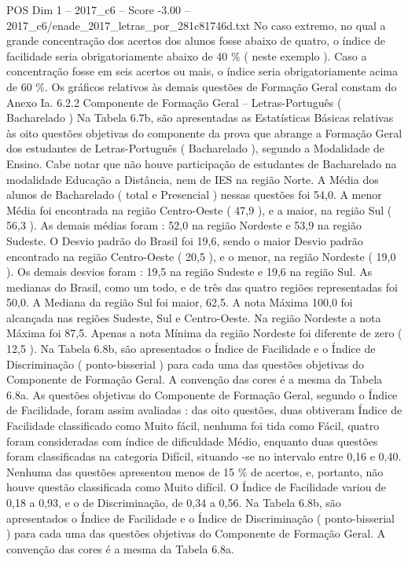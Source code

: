 \begin{textsample}{POS Dim 1 – 2017\_c6 – Score -3.00 – 2017\_c6/enade\_2017\_letras\_por\_281c81746d.txt}
No caso extremo, no qual a grande concentração dos acertos dos alunos fosse abaixo de quatro, o índice de facilidade seria obrigatoriamente abaixo de 40 \% ( neste exemplo ).
Caso a concentração fosse em seis acertos ou mais, o índice seria obrigatoriamente acima de 60 \%.
Os gráficos relativos às demais questões de Formação Geral constam do Anexo Ia. 6.2.2 Componente de Formação Geral – Letras-Português ( Bacharelado ) Na Tabela 6.7b, são apresentadas as Estatísticas Básicas relativas às oito questões objetivas do componente da prova que abrange a Formação Geral dos estudantes de Letras-Português ( Bacharelado ), segundo a Modalidade de Ensino.
Cabe notar que não houve participação de estudantes de Bacharelado na modalidade Educação a Distância, nem de IES na região Norte.
A Média dos alunos de Bacharelado ( total e Presencial ) nessas questões foi 54,0.
A menor Média foi encontrada na região Centro-Oeste ( 47,9 ), e a maior, na região Sul ( 56,3 ).
As demais médias foram : 52,0 na região Nordeste e 53,9 na região Sudeste.
O Desvio padrão do Brasil foi 19,6, sendo o maior Desvio padrão encontrado na região Centro-Oeste ( 20,5 ), e o menor, na região Nordeste ( 19,0 ).
Os demais desvios foram : 19,5 na região Sudeste e 19,6 na região Sul.
As medianas do Brasil, como um todo, e de três das quatro regiões representadas foi 50,0.
A Mediana da região Sul foi maior, 62,5.
A nota Máxima 100,0 foi alcançada nas regiões Sudeste, Sul e Centro-Oeste.
Na região Nordeste a nota Máxima foi 87,5.
Apenas a nota Mínima da região Nordeste foi diferente de zero ( 12,5 ).
Na Tabela 6.8b, são apresentados o Índice de Facilidade e o Índice de Discriminação ( ponto-bisserial ) para cada uma das questões objetivas do Componente de Formação Geral.
A convenção das cores é a mesma da Tabela 6.8a.
As questões objetivas do Componente de Formação Geral, segundo o Índice de Facilidade, foram assim avaliadas : das oito questões, duas obtiveram Índice de Facilidade classificado como Muito fácil, nenhuma foi tida como Fácil, quatro foram consideradas com índice de dificuldade Médio, enquanto duas questões foram classificadas na categoria Difícil, situando -se no intervalo entre 0,16 e 0,40.
Nenhuma das questões apresentou menos de 15 \% de acertos, e, portanto, não houve questão classificada como Muito difícil.
O Índice de Facilidade variou de 0,18 a 0,93, e o de Discriminação, de 0,34 a 0,56.
Na Tabela 6.8b, são apresentados o Índice de Facilidade e o Índice de Discriminação ( ponto-bisserial ) para cada uma das questões objetivas do Componente de Formação Geral.
A convenção das cores é a mesma da Tabela 6.8a.

\end{textsample}
